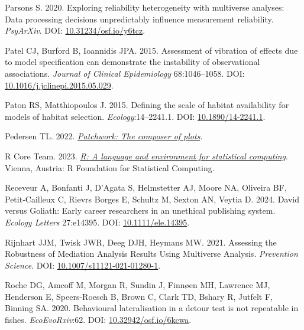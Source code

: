 \documentclass[10pt,a4paper]{article}
\newlength{\cslhangindent}
\newenvironment{CSLReferences}[2] %
 {\begin{list}{}{%
  \setlength{\itemindent}{0pt}
  \setlength{\leftmargin}{0pt}
  \setlength{\parsep}{0pt}
  \ifodd #1
   \setlength{\leftmargin}{\cslhangindent}
   \setlength{\itemindent}{-1\cslhangindent}
  \fi
  \setlength{\itemsep}{#2\baselineskip}}}
 {\end{list}}
\begin{document}
\begin{CSLReferences}{1}{0}
Parsons S. 2020. Exploring reliability heterogeneity with multiverse analyses: {Data} processing decisions unpredictably influence measurement reliability. \emph{PsyArXiv}. DOI: \href{https://doi.org/10.31234/osf.io/y6tcz}{10.31234/osf.io/y6tcz}.

Patel CJ, Burford B, Ioannidis JPA. 2015. Assessment of vibration of effects due to model specification can demonstrate the instability of observational associations. \emph{Journal of Clinical Epidemiology} 68:1046--1058. DOI: \href{https://doi.org/10.1016/j.jclinepi.2015.05.029}{10.1016/j.jclinepi.2015.05.029}.

Paton RS, Matthiopoulos J. 2015. Defining the scale of habitat availability for models of habitat selection. \emph{Ecology}:14--2241.1. DOI: \href{https://doi.org/10.1890/14-2241.1}{10.1890/14-2241.1}.

Pedersen TL. 2022. \emph{\href{https://CRAN.R-project.org/package=patchwork}{Patchwork: The composer of plots}}.

R Core Team. 2023. \emph{\href{https://www.R-project.org/}{R: A language and environment for statistical computing}}. Vienna, Austria: R Foundation for Statistical Computing.

Receveur A, Bonfanti J, D'Agata S, Helmstetter AJ, Moore NA, Oliveira BF, Petit‐Cailleux C, Rievrs Borges E, Schultz M, Sexton AN, Veytia D. 2024. David versus {Goliath}: {Early} career researchers in an unethical publishing system. \emph{Ecology Letters} 27:e14395. DOI: \href{https://doi.org/10.1111/ele.14395}{10.1111/ele.14395}.

Rijnhart JJM, Twisk JWR, Deeg DJH, Heymans MW. 2021. Assessing the {Robustness} of {Mediation} {Analysis} {Results} {Using} {Multiverse} {Analysis}. \emph{Prevention Science}. DOI: \href{https://doi.org/10.1007/s11121-021-01280-1}{10.1007/s11121-021-01280-1}.

Roche DG, Amcoff M, Morgan R, Sundin J, Finnøen MH, Lawrence MJ, Henderson E, Speers-Roesch B, Brown C, Clark TD, Bshary R, Jutfelt F, Binning SA. 2020. Behavioural lateralisation in a detour test is not repeatable in fishes. \emph{EcoEvoRxiv}:62. DOI: \href{https://doi.org/10.32942/osf.io/6kcwa}{10.32942/osf.io/6kcwa}.


\end{CSLReferences}
\end{document}
